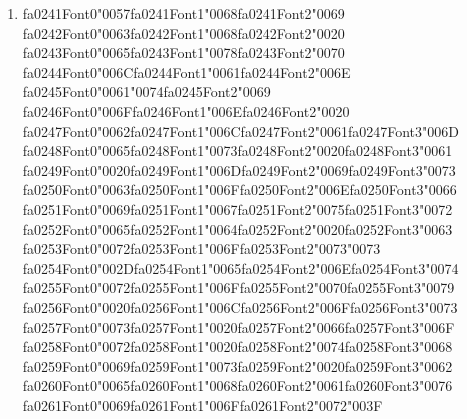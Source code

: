 \documentclass[12pt]{article}
\begin{document}
\begin{enumerate}[label=Q\arabic*.]
 \item {\csname fa0241Font0\endcsname\char"0057}{\csname fa0241Font1\endcsname\char"0068}{\csname fa0241Font2\endcsname\char"0069} {\csname fa0242Font0\endcsname\char"0063}{\csname fa0242Font1\endcsname\char"0068}{\csname fa0242Font2\endcsname\char"0020} {\csname fa0243Font0\endcsname\char"0065}{\csname fa0243Font1\endcsname\char"0078}{\csname fa0243Font2\endcsname\char"0070} {\csname fa0244Font0\endcsname\char"006C}{\csname fa0244Font1\endcsname\char"0061}{\csname fa0244Font2\endcsname\char"006E} {\csname fa0245Font0\endcsname\char"0061}{\char"0074}{\csname fa0245Font2\endcsname\char"0069} {\csname fa0246Font0\endcsname\char"006F}{\csname fa0246Font1\endcsname\char"006E}{\csname fa0246Font2\endcsname\char"0020} {\csname fa0247Font0\endcsname\char"0062}{\csname fa0247Font1\endcsname\char"006C}{\csname fa0247Font2\endcsname\char"0061}{\csname fa0247Font3\endcsname\char"006D} {\csname fa0248Font0\endcsname\char"0065}{\csname fa0248Font1\endcsname\char"0073}{\csname fa0248Font2\endcsname\char"0020}{\csname fa0248Font3\endcsname\char"0061} {\csname fa0249Font0\endcsname\char"0020}{\csname fa0249Font1\endcsname\char"006D}{\csname fa0249Font2\endcsname\char"0069}{\csname fa0249Font3\endcsname\char"0073} {\csname fa0250Font0\endcsname\char"0063}{\csname fa0250Font1\endcsname\char"006F}{\csname fa0250Font2\endcsname\char"006E}{\csname fa0250Font3\endcsname\char"0066} {\csname fa0251Font0\endcsname\char"0069}{\csname fa0251Font1\endcsname\char"0067}{\csname fa0251Font2\endcsname\char"0075}{\csname fa0251Font3\endcsname\char"0072} {\csname fa0252Font0\endcsname\char"0065}{\csname fa0252Font1\endcsname\char"0064}{\csname fa0252Font2\endcsname\char"0020}{\csname fa0252Font3\endcsname\char"0063} {\csname fa0253Font0\endcsname\char"0072}{\csname fa0253Font1\endcsname\char"006F}{\csname fa0253Font2\endcsname\char"0073}{\char"0073} {\csname fa0254Font0\endcsname\char"002D}{\csname fa0254Font1\endcsname\char"0065}{\csname fa0254Font2\endcsname\char"006E}{\csname fa0254Font3\endcsname\char"0074} {\csname fa0255Font0\endcsname\char"0072}{\csname fa0255Font1\endcsname\char"006F}{\csname fa0255Font2\endcsname\char"0070}{\csname fa0255Font3\endcsname\char"0079} {\csname fa0256Font0\endcsname\char"0020}{\csname fa0256Font1\endcsname\char"006C}{\csname fa0256Font2\endcsname\char"006F}{\csname fa0256Font3\endcsname\char"0073} {\csname fa0257Font0\endcsname\char"0073}{\csname fa0257Font1\endcsname\char"0020}{\csname fa0257Font2\endcsname\char"0066}{\csname fa0257Font3\endcsname\char"006F} {\csname fa0258Font0\endcsname\char"0072}{\csname fa0258Font1\endcsname\char"0020}{\csname fa0258Font2\endcsname\char"0074}{\csname fa0258Font3\endcsname\char"0068} {\csname fa0259Font0\endcsname\char"0069}{\csname fa0259Font1\endcsname\char"0073}{\csname fa0259Font2\endcsname\char"0020}{\csname fa0259Font3\endcsname\char"0062} {\csname fa0260Font0\endcsname\char"0065}{\csname fa0260Font1\endcsname\char"0068}{\csname fa0260Font2\endcsname\char"0061}{\csname fa0260Font3\endcsname\char"0076} {\csname fa0261Font0\endcsname\char"0069}{\csname fa0261Font1\endcsname\char"006F}{\csname fa0261Font2\endcsname\char"0072}{\char"003F}

\end{enumerate}
\end{document}
